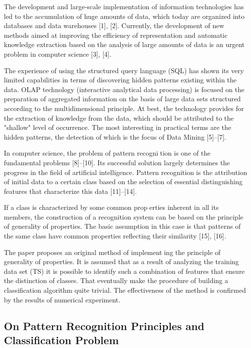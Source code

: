 \documentclass[10pt, a4paper]{article}
\begin{document}
\begin{multicols}{2}
The development and large-scale implementation of
information technologies has led to the accumulation
of huge amounts of data, which today are organized
into databases and data warehouses [1], [2]. Currently,
the development of new methods aimed at improving
the efficiency of representation and automatic knowledge
extraction based on the analysis of large amounts of data
is an urgent problem in computer science [3], [4].
\par
The experience of using the structured query language
(SQL) has shown its very limited capabilities in terms
of discovering hidden patterns existing within the data.
OLAP technology (interactive analytical data processing)
is focused on the preparation of aggregated information
on the basis of large data sets structured according to
the multidimensional principle. At best, the technology
provides for the extraction of knowledge from the data,
which should be attributed to the "shallow" level of
occurrence. The most interesting in practical terms are
the hidden patterns, the detection of which is the focus
of Data Mining [5]–[7].
\par
In computer science, the problem of pattern recognition is one of the fundamental problems [8]–[10]. Its
successful solution largely determines the progress in
the field of artificial intelligence. Pattern recognition is
the attribution of initial data to a certain class based
on the selection of essential distinguishing features that
characterize this data [11]–[14].
\par
If a class is characterized by some common properties inherent in all its members, the construction of
a recognition system can be based on the principle of
generality of properties. The basic assumption in this
case is that patterns of the same class have common
properties reflecting their similarity [15], [16].
\par
The paper proposes an original method of implementing the principle of generality of properties. It is assumed
that as a result of analyzing the training data set (TS) it is
possible to identify such a combination of features that
ensure the distinction of classes. That eventually make
the procedure of building a classification algorithm quite
trivial. The effectiveness of the method is confirmed by
the results of numerical experiment.

\begin{center}
\par
    \section{ On Pattern Recognition Principles and
Classification Problem}
\end{center}



\end{multicols}
\end{document}
